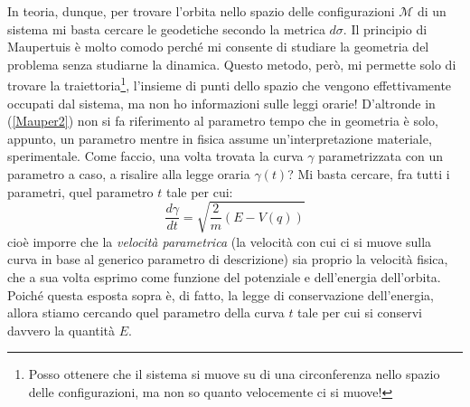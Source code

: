 \documentclass[a4paper,openany]{article}
\begin{document}
	In teoria, dunque, per trovare l'orbita nello spazio delle configurazioni $\mathcal{M}$ di un sistema mi basta cercare le geodetiche secondo la metrica $d\sigma$. Il principio di Maupertuis è molto comodo perché mi consente di studiare la geometria del problema senza studiarne la dinamica. Questo metodo, però, mi permette solo di trovare la traiettoria\footnote{Posso ottenere che il sistema si muove su di una circonferenza nello spazio delle configurazioni, ma non so quanto velocemente ci si muove!}, l'insieme di punti dello spazio che vengono effettivamente occupati dal sistema, ma non ho informazioni sulle leggi orarie! D'altronde in (\ref{Mauper2}) non si fa riferimento al parametro tempo che in geometria è solo, appunto, un parametro mentre in fisica assume un'interpretazione materiale, sperimentale. Come faccio, una volta trovata la curva $\gamma$ parametrizzata con un parametro a caso, a risalire alla legge oraria $\gamma(t)$? Mi basta cercare, fra tutti i parametri, quel parametro $t$ tale per cui:
	\begin{equation}\label{key}
		\dfrac{d\gamma}{dt} = \sqrt{\dfrac{2}{m}(E-V(q))}
	\end{equation}
	cioè imporre che la \textit{velocità parametrica} (la velocità con cui ci si muove sulla curva in base al generico parametro di descrizione) sia proprio la velocità fisica, che a sua volta esprimo come funzione del potenziale e dell'energia dell'orbita. Poiché questa esposta sopra è, di fatto, la legge di conservazione dell'energia, allora stiamo cercando quel parametro della curva $t$ tale per cui si conservi davvero la quantità $E$.
\end{document}
